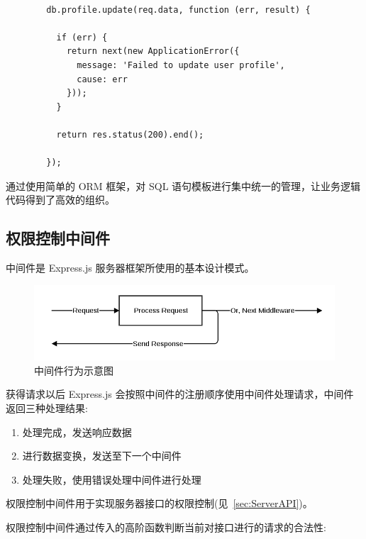 \begin{verbatim}

        db.profile.update(req.data, function (err, result) {

          if (err) {
            return next(new ApplicationError({
              message: 'Failed to update user profile',
              cause: err
            }));
          }

          return res.status(200).end();

        });

\end{verbatim}

通过使用简单的 ORM 框架，对 SQL 语句模板进行集中统一的管理，让业务逻辑代码得到了高效的组织。

\subsection{权限控制中间件}

中间件是 Express.js 服务器框架所使用的基本设计模式。

\begin{figure}[!h]
  \begin{center}
    \includegraphics[width=\textwidth]{figures/diagram-express-middleware.png}
    \caption{中间件行为示意图\label{ExpressMiddleware}}
  \end{center}
\end{figure}

获得请求以后 Express.js 会按照中间件的注册顺序使用中间件处理请求，中间件返回三种处理结果:

\begin{enumerate}
  \item 处理完成，发送响应数据
  \item 进行数据变换，发送至下一个中间件
  \item 处理失败，使用错误处理中间件进行处理
\end{enumerate}

权限控制中间件用于实现服务器接口的权限控制(见~\ref{sec:ServerAPI})。

权限控制中间件通过传入的高阶函数判断当前对接口进行的请求的合法性:

